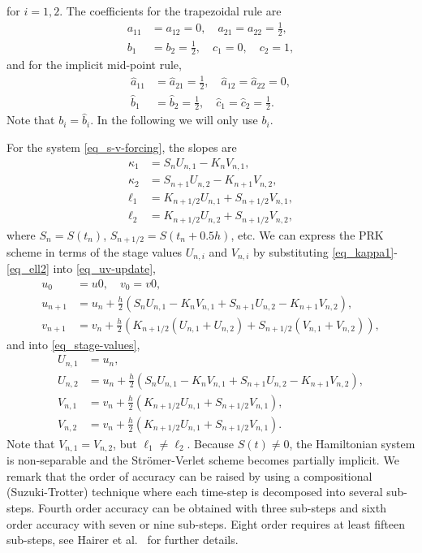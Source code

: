 \documentclass[11pt]{article}
\begin{document}
for $i=1,2$. The coefficients for the trapezoidal rule are
\begin{align}
  a_{11} &= a_{12} = 0,\quad a_{21} = a_{22} = \frac{1}{2},\\
  b_{1} &= b_2 = \frac{1}{2},\quad  c_1 = 0,\quad c_2=1,
\end{align}
and for the implicit mid-point rule,
\begin{align}
  \hat{a}_{11} &= \hat{a}_{21} = \frac{1}{2},\quad \hat{a}_{12} = \hat{a}_{22} = 0,\\
  \hat{b}_{1} &= \hat{b}_2 = \frac{1}{2},\quad  \hat{c}_1 = \hat{c}_2=\frac{1}{2}.
\end{align}
Note that $b_i = \hat{b}_i$. In the following we will only use $b_i$.

For the system \eqref{eq_s-v-forcing}, the slopes are
\begin{align}
\kappa_1 &= S_nU_{n,1} - K_nV_{n,1} ,\label{eq_kappa1}\\
\kappa_2 &= S_{n+1}U_{n,2} - K_{n+1}V_{n,2},\\
\ell_1 &= K_{n+1/2} U_{n,1} + S_{n+1/2} V_{n,1},\\
\ell_2 &= K_{n+1/2} U_{n,2} + S_{n+1/2} V_{n,2},\label{eq_ell2}
\end{align}
where $S_n = S(t_{n})$, $S_{n+1/2} = S(t_n + 0.5 h)$, etc. We can express the PRK scheme in terms of
the stage values $U_{n,i}$ and $V_{n,i}$ by substituting \eqref{eq_kappa1}-\eqref{eq_ell2} into \eqref{eq_uv-update},
\begin{align}
  u_0 &= u0,\quad v_0 = v0,\label{eq_initial-cond}\\
  u_{n+1} &= u_n + \frac{h}{2}\left(S_nU_{n,1} - K_nV_{n,1} + S_{n+1}U_{n,2} - K_{n+1}V_{n,2}
  \right),\label{eq_u-update}\\
  v_{n+1} &= v_n + \frac{h}{2}\left(K_{n+1/2} \left(U_{n,1} + U_{n,2}\right) + S_{n+1/2}\left(
  V_{n,1} +  V_{n,2}\right) \right),\label{eq_v-update}
\end{align}
and into \eqref{eq_stage-values},
\begin{align} 
  U_{n,1} &= u_n,\label{eq_U1}\\
  U_{n,2} &= u_n + \frac{h}{2}\left(S_nU_{n,1} - K_nV_{n,1} + S_{n+1}U_{n,2} -
  K_{n+1}V_{n,2} \right),\\
  V_{n,1} &= v_n + \frac{h}{2}\left(  K_{n+1/2} U_{n,1} + S_{n+1/2} V_{n,1} \right),\\
  V_{n,2} &= v_n + \frac{h}{2}\left(  K_{n+1/2} U_{n,1} + S_{n+1/2} V_{n,1} \right).\label{eq_V2}
\end{align}
Note that $V_{n,1} = V_{n,2}$, but $\ell_1 \ne \ell_2$. Because $S(t)\ne0$, the Hamiltonian system
is non-separable and the Str\"omer-Verlet scheme becomes partially implicit. We remark that the order
of accuracy can be raised by using a compositional (Suzuki-Trotter) technique where each time-step
is decomposed into several sub-steps. Fourth order accuracy can be obtained with three sub-steps and
sixth order accuracy with seven or nine sub-steps. Eight order requires at least fifteen sub-steps, see
Hairer et al.~\cite{HairerLubichWanner-06} for further details.
\end{document}
